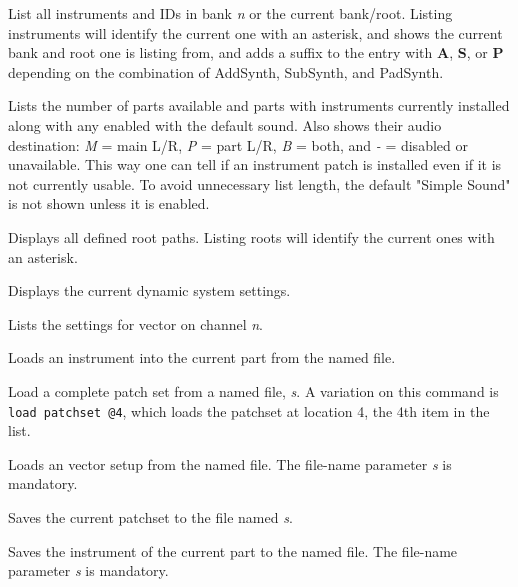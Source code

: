       List all instruments and IDs in bank \textsl{n}
      or the current bank/root.
      Listing instruments will identify the current one with an asterisk, and
      shows the current bank and root one is listing from, and adds a suffix to
      the entry with \textbf{A}, \textbf{S}, or \textbf{P}
      depending on the combination of AddSynth, SubSynth, and PadSynth.

      Lists the number of parts available and parts with instruments
      currently installed along with any enabled with the default sound.
      Also shows their audio destination:
      \textsl{M} = main L/R, \textsl{P} = part L/R, \textsl{B} = both, and
      \textsl{-} = disabled or unavailable.
      This way one can tell if an instrument patch is installed even if it is
      not currently usable.
      To avoid unnecessary list length, the default "Simple Sound" is not shown
      unless it is enabled.

      Displays all defined root paths.
      Listing roots will identify the current ones with an asterisk.

      Displays the current dynamic system settings.

      Lists the settings for vector on channel \textsl{n}.

      Loads an instrument into the current part from the named file.

      Load a complete patch set from a named file, \textsl{s}.
      A variation on this command is \texttt{load patchset @4}, which
      loads the patchset at location 4, the 4th item in the list.

      Loads an vector setup from the named file.
      The file-name parameter \textsl{s} is mandatory.

      Saves the current patchset to the file named \textsl{s}.

      Saves the instrument of the current part to the named file.
      The file-name parameter \textsl{s} is mandatory.

